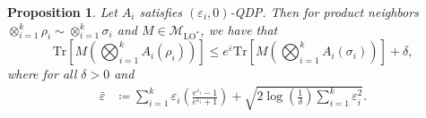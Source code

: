 \documentclass[11pt]{article}
\def\Tr{\mathrm{Tr}}
\theoremstyle{plain}
\newtheorem{proposition}[theo]{Proposition}
\theoremstyle{remark}
\begin{document}
\begin{proposition}
    Let $A_i$ satisfies $(\varepsilon_i, 0)$-QDP. Then for product neighbors $ \otimes_{i=1}^k \rho_i \sim \otimes_{i=1}^k \sigma_i$ and $M\in \mathcal{M}_{\operatorname{LO}^*}$, we have that 
    \begin{equation}
        \Tr\!\left[ M \left( \bigotimes_{i=1}^k A_i(\rho_i) \right) \right] \leq e^{\bar{\varepsilon}} \Tr\!\left[ M \left( \bigotimes_{i=1}^k A_i(\sigma_i) \right) \right] + {\delta},
    \end{equation}
where for all $\delta > 0$ and
\begin{align}
    \bar{\varepsilon} & \coloneqq  \sum_{i=1}^k \varepsilon_i \left( \frac{e^{\varepsilon_i}-1}{e^{\varepsilon_i} +1} \right) + \sqrt{2 \log\!\left( \frac{1}{\delta} \right) \sum_{i=1}^k {\varepsilon_i^2} }. 
\end{align}
\end{proposition}
\end{document}
